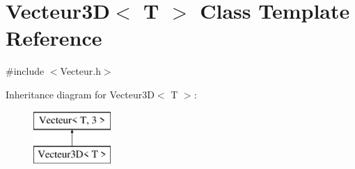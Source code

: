 \hypertarget{class_vecteur3_d}{\section{Vecteur3\-D$<$ T $>$ Class Template Reference}
\label{class_vecteur3_d}
}


{\ttfamily \#include $<$Vecteur.\-h$>$}

Inheritance diagram for Vecteur3\-D$<$ T $>$\-:\begin{figure}[H]
\begin{center}
\leavevmode
\includegraphics[height=2.000000cm]{class_vecteur3_d}
\end{center}
\end{figure}
